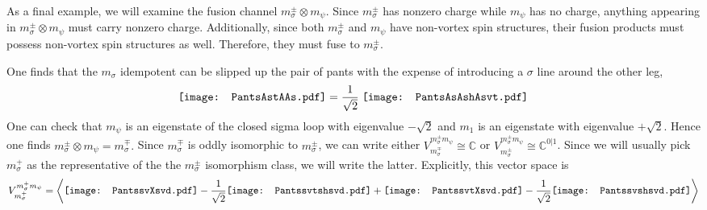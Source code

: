 \documentclass[12pt,a4paper]{article}
\newcommand{\tp}{\otimes}
\newcommand{\cc}{\mathbb{C}}
\newcommand{\fld}{\mathcal{F}} %
\newcommand{\PantsAsAshAsvt}{\mathord{\vcenter{\hbox{\texttt{[image: PantsAsAshAsvt.pdf]}}}}}
\newcommand{\PantsAstAAs}{\mathord{\vcenter{\hbox{\texttt{[image: PantsAstAAs.pdf]}}}}}
\newcommand{\PantsAstAshAs}{\mathord{\vcenter{\hbox{\texttt{[image: PantsAstAshAs.pdf]}}}}}
\newcommand{\PantsAsAshAs}{\mathord{\vcenter{\hbox{\texttt{[image: PantsAsAshAs.pdf]}}}}}
\newcommand{\PantsAsAAs}{\mathord{\vcenter{\hbox{\texttt{[image: PantsAsAAs.pdf]}}}}}
\newcommand{\PantssvtXsvd}{\mathord{\vcenter{\hbox{\texttt{[image: PantssvtXsvd.pdf]}}}}}
\newcommand{\Pantssvtshsvd}{\mathord{\vcenter{\hbox{\texttt{[image: Pantssvtshsvd.pdf]}}}}}
\newcommand{\Pantssvshsvd}{\mathord{\vcenter{\hbox{\texttt{[image: Pantssvshsvd.pdf]}}}}}
\newcommand{\PantssvXsvd}{\mathord{\vcenter{\hbox{\texttt{[image: PantssvXsvd.pdf]}}}}}
\begin{document}
As a final example, we will examine the fusion channel $m_\sigma^{\pm} \tp m_\psi$. 
Since $m_\sigma^{\pm}$ has nonzero charge while $m_\psi$ has no charge, anything appearing in $m_\sigma^\pm \tp m_\psi$ must carry nonzero charge. Additionally, since both $m_\sigma^\pm$ and $m_\psi$ have non-vortex spin structures, their fusion products must possess non-vortex spin structures as well. Therefore, they must fuse to $m_\sigma^\pm$.  

One finds that the $m_\sigma$ idempotent can be slipped up the pair of pants with the expense of introducing a $\sigma$ line around the other leg,
\begin{align}
\PantsAstAAs  = \frac{1}{\sqrt{2}} \;  \PantsAsAshAsvt
\end{align}
One can check that $m_\psi$ is an eigenstate of the closed sigma loop with eigenvalue $-\sqrt{2}$ and $m_1$ is an eigenstate with eigenvalue $+\sqrt{2}$. Hence one finds $m_\sigma^{\pm} \tp m_\psi  = m_\sigma^{\mp}.$ Since $m^\mp_\sigma$ is oddly isomorphic to $m_\sigma^\pm$, we can write either $V^{m_\sigma^\pm m_\psi}_{m_\sigma^\mp} \cong \cc$ or $V^{m_\sigma^\pm m_\psi}_{m_\sigma^\pm} \cong \cc^{0|1}$. Since we will usually pick $m_\sigma^+$ as the representative of the the $m_\sigma^\pm$ isomorphism class, we will write the latter.
Explicitly, this vector space is
\begin{align}
V^{m_\sigma^+ m_\psi}_{m_\sigma^+} = \left\langle \PantssvXsvd -\frac{1}{\sqrt{2}}\Pantssvtshsvd + \PantssvtXsvd  - \frac{1}{\sqrt{2}} \Pantssvshsvd   \right \rangle 
\end{align}
\end{document}
